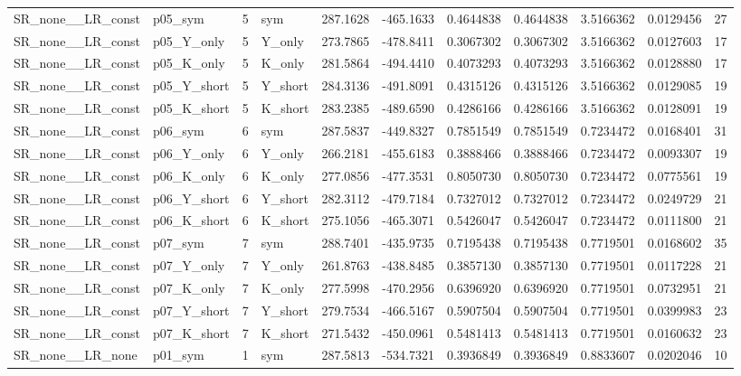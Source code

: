\begin{table}[!h]
\begin{tabular}[t]{llrlrrrrrrr}
\addlinespace
SR\_none\_\_LR\_const & p05\_sym & 5 & sym & 287.1628 & -465.1633 & 0.4644838 & 0.4644838 & 3.5166362 & 0.0129456 & 27\\
SR\_none\_\_LR\_const & p05\_Y\_only & 5 & Y\_only & 273.7865 & -478.8411 & 0.3067302 & 0.3067302 & 3.5166362 & 0.0127603 & 17\\
SR\_none\_\_LR\_const & p05\_K\_only & 5 & K\_only & 281.5864 & -494.4410 & 0.4073293 & 0.4073293 & 3.5166362 & 0.0128880 & 17\\
SR\_none\_\_LR\_const & p05\_Y\_short & 5 & Y\_short & 284.3136 & -491.8091 & 0.4315126 & 0.4315126 & 3.5166362 & 0.0129085 & 19\\
SR\_none\_\_LR\_const & p05\_K\_short & 5 & K\_short & 283.2385 & -489.6590 & 0.4286166 & 0.4286166 & 3.5166362 & 0.0128091 & 19\\
\addlinespace
SR\_none\_\_LR\_const & p06\_sym & 6 & sym & 287.5837 & -449.8327 & 0.7851549 & 0.7851549 & 0.7234472 & 0.0168401 & 31\\
SR\_none\_\_LR\_const & p06\_Y\_only & 6 & Y\_only & 266.2181 & -455.6183 & 0.3888466 & 0.3888466 & 0.7234472 & 0.0093307 & 19\\
SR\_none\_\_LR\_const & p06\_K\_only & 6 & K\_only & 277.0856 & -477.3531 & 0.8050730 & 0.8050730 & 0.7234472 & 0.0775561 & 19\\
SR\_none\_\_LR\_const & p06\_Y\_short & 6 & Y\_short & 282.3112 & -479.7184 & 0.7327012 & 0.7327012 & 0.7234472 & 0.0249729 & 21\\
SR\_none\_\_LR\_const & p06\_K\_short & 6 & K\_short & 275.1056 & -465.3071 & 0.5426047 & 0.5426047 & 0.7234472 & 0.0111800 & 21\\
\addlinespace
SR\_none\_\_LR\_const & p07\_sym & 7 & sym & 288.7401 & -435.9735 & 0.7195438 & 0.7195438 & 0.7719501 & 0.0168602 & 35\\
SR\_none\_\_LR\_const & p07\_Y\_only & 7 & Y\_only & 261.8763 & -438.8485 & 0.3857130 & 0.3857130 & 0.7719501 & 0.0117228 & 21\\
SR\_none\_\_LR\_const & p07\_K\_only & 7 & K\_only & 277.5998 & -470.2956 & 0.6396920 & 0.6396920 & 0.7719501 & 0.0732951 & 21\\
SR\_none\_\_LR\_const & p07\_Y\_short & 7 & Y\_short & 279.7534 & -466.5167 & 0.5907504 & 0.5907504 & 0.7719501 & 0.0399983 & 23\\
SR\_none\_\_LR\_const & p07\_K\_short & 7 & K\_short & 271.5432 & -450.0961 & 0.5481413 & 0.5481413 & 0.7719501 & 0.0160632 & 23\\
\addlinespace
SR\_none\_\_LR\_none & p01\_sym & 1 & sym & 287.5813 & -534.7321 & 0.3936849 & 0.3936849 & 0.8833607 & 0.0202046 & 10\\

\end{tabular}
\end{table}
